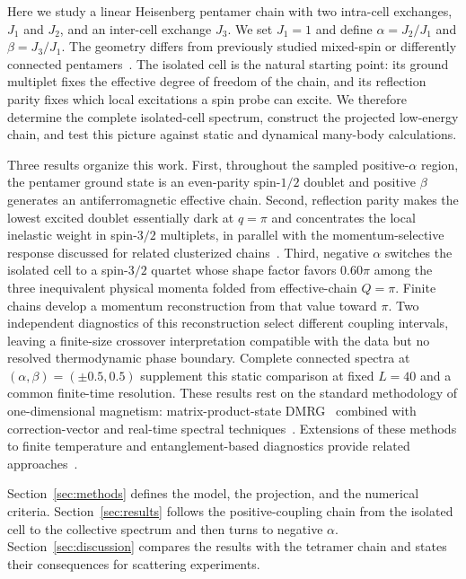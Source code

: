 Here we study a linear Heisenberg pentamer chain with two intra-cell exchanges,
$J_1$ and $J_2$, and an inter-cell exchange $J_3$.
We set $J_1=1$ and define $\alpha=J_2/J_1$ and $\beta=J_3/J_1$.
The geometry differs from previously studied mixed-spin or differently connected
pentamers~\cite{haraldsen2011pentamer}.
The isolated cell is the natural starting point: its ground multiplet fixes the
effective degree of freedom of the chain, and its reflection parity fixes which
local excitations a spin probe can excite.
We therefore determine the complete isolated-cell spectrum, construct the
projected low-energy chain, and test this picture against static and dynamical
many-body calculations.

Three results organize this work.
First, throughout the sampled positive-$\alpha$ region, the pentamer ground
state is an even-parity spin-$1/2$ doublet and positive $\beta$ generates an
antiferromagnetic effective chain.
Second, reflection parity makes the lowest excited doublet essentially dark at
$q=\pi$ and concentrates the local inelastic weight in spin-$3/2$ multiplets, in
parallel with the momentum-selective response discussed for related clusterized
chains~\cite{gao2024srv3o9,schlappa2018,ishii2025kedge}.
Third, negative $\alpha$ switches the isolated cell to a spin-$3/2$ quartet whose
shape factor favors $0.60\pi$ among the three inequivalent physical momenta
folded from effective-chain $Q=\pi$.
Finite chains develop a momentum reconstruction from that value toward $\pi$.
Two independent diagnostics of this reconstruction select different coupling
intervals, leaving a finite-size crossover interpretation compatible with the
data but no resolved thermodynamic phase boundary.
Complete connected spectra at $(\alpha,\beta)=(\pm0.5,0.5)$ supplement this
static comparison at fixed $L=40$ and a common finite-time resolution.
These results rest on the standard methodology of one-dimensional magnetism: matrix-product-state
DMRG~\cite{white1992,schollwoeck2005,schollwoeck2011} combined with
correction-vector and real-time spectral
techniques~\cite{kuehner1999,jeckelmann2002,vidal2004,paeckel2019}.
Extensions of these methods to finite temperature and entanglement-based
diagnostics provide related approaches~\cite{barthel2009,fishman2022,keselman2020}.

Section~\ref{sec:methods} defines the model, the projection, and the numerical
criteria.
Section~\ref{sec:results} follows the positive-coupling chain from the isolated
cell to the collective spectrum and then turns to negative $\alpha$.
Section~\ref{sec:discussion} compares the results with the tetramer chain and
states their consequences for scattering experiments.
